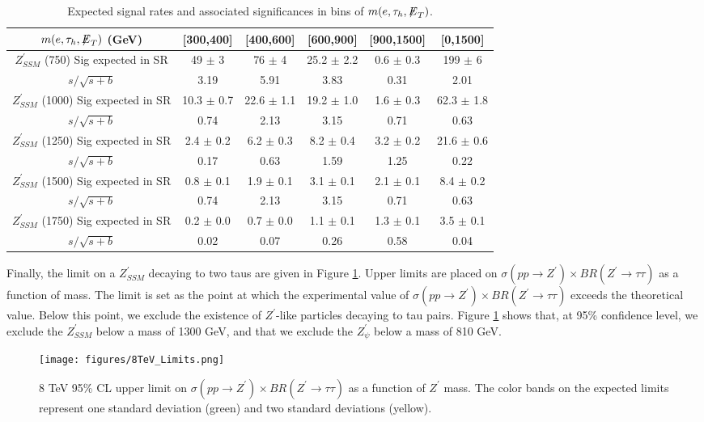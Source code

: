 \begin{table}[ht]
\begin{center}
  \caption{Expected signal rates and associated significances in bins of $m(e,\tau_{h},{\not\mathrel{E}}_T)$. }\label{tab:8TeV_SignalRates}
  \begin{tabular}{| c | c | c | c | c | c |}
  \hline
$m(e,\tau_{h},{\not\mathrel{E}}_T)$ (GeV) & [300,400] & [400,600] & [600,900] & [900,1500] & [0,1500]   \\ \hline
$Z^\prime_{SSM}$ (750) 
   Sig expected in SR  & 49 $\pm$ 3  & 76 $\pm$ 4  & 25.2 $\pm$ 2.2  & 0.6 $\pm$ 0.3 & 199 $\pm$ 6 \\
   $s/\sqrt{s+b}$ & 3.19  & 5.91 & 3.83 & 0.31 & 2.01   \\   \hline
$Z^\prime_{SSM}$ (1000)
   Sig expected in SR  & 10.3 $\pm$ 0.7  & 22.6 $\pm$ 1.1  & 19.2 $\pm$ 1.0  & 1.6 $\pm$ 0.3 & 62.3 $\pm$ 1.8 \\
   $s/\sqrt{s+b}$ & 0.74  & 2.13 & 3.15 & 0.71 & 0.63   \\   \hline
$Z^\prime_{SSM}$ (1250)
   Sig expected in SR  & 2.4 $\pm$ 0.2  & 6.2 $\pm$ 0.3  & 8.2 $\pm$ 0.4  & 3.2 $\pm$ 0.2 & 21.6 $\pm$ 0.6 \\
   $s/\sqrt{s+b}$ & 0.17  & 0.63 & 1.59 & 1.25 & 0.22   \\   \hline
  \hline
$Z^\prime_{SSM}$ (1500)
   Sig expected in SR  & 0.8 $\pm$ 0.1  & 1.9 $\pm$ 0.1  & 3.1 $\pm$ 0.1  & 2.1 $\pm$ 0.1 & 8.4 $\pm$ 0.2 \\
   $s/\sqrt{s+b}$ & 0.74  & 2.13 & 3.15 & 0.71 & 0.63   \\   \hline  
$Z^\prime_{SSM}$ (1750)
   Sig expected in SR  & 0.2 $\pm$ 0.0  & 0.7 $\pm$ 0.0  & 1.1 $\pm$ 0.1  & 1.3 $\pm$ 0.1 & 3.5 $\pm$ 0.1 \\
   $s/\sqrt{s+b}$ & 0.02  & 0.07 & 0.26 & 0.58 & 0.04   \\   \hline  
  \end{tabular}
\end{center}
\end{table}

Finally, the limit on a $Z^{\prime}_{SSM}$ decaying to two taus are given in Figure \ref{fig:8TeV_Limits}. Upper limits are placed on $\sigma\left(pp\to Z^{\prime}\right)\times BR\left(Z^{\prime}\to\tau\tau\right)$ as a function of mass. The limit is set as the point at which the experimental value of $\sigma\left(pp\to Z^{\prime}\right)\times BR\left(Z^{\prime}\to\tau\tau\right)$ exceeds the theoretical value. Below this point, we exclude the existence of $Z^{\prime}$-like particles decaying to tau pairs. Figure \ref{fig:8TeV_Limits} shows that, at 95\% confidence level, we exclude the $Z^{\prime}_{SSM}$ below a mass of 1300 GeV, and that we exclude the $Z^{\prime}_{\psi}$ below a mass of 810 GeV.

\begin{figure}[tbh!]
\centering
\texttt{[image: figures/8TeV\_Limits.png]}
\caption{8 TeV 95\% CL upper limit on $\sigma\left(pp\to Z^{\prime}\right)\times BR\left(Z^{\prime}\to\tau\tau\right)$ 
as a function of $Z^{\prime}$ mass. The color bands on the expected limits represent one standard deviation (green) and two standard deviations (yellow).}
\label{fig:8TeV_Limits}
\end{figure}
